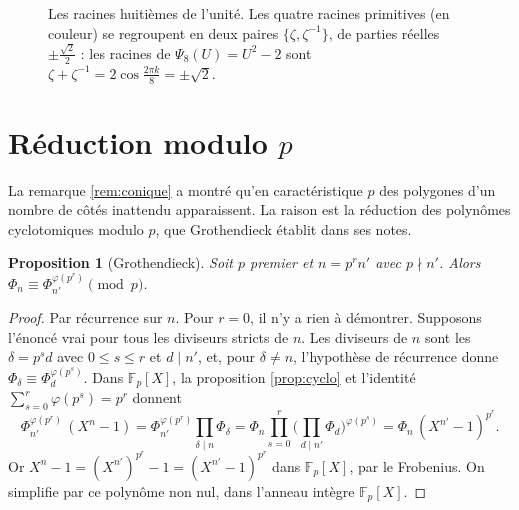 \documentclass[11pt,a4paper]{article}
\theoremstyle{plain}
\newtheorem{proposition}[theoreme]{Proposition}
\theoremstyle{definition}
\theoremstyle{remark}
\newcommand{\F}{\mathbb{F}}
\begin{document}
\begin{figure}[h]
\centering
{}
\caption{Les racines huitièmes de l'unité. Les quatre racines primitives (en couleur) se regroupent en deux paires $\{\zeta,\zeta^{-1}\}$, de parties réelles $\pm\frac{\sqrt2}2$ : les racines de $\Psi_8(U)=U^2-2$ sont $\zeta+\zeta^{-1}=2\cos\frac{2\pi k}8=\pm\sqrt2$.}\label{fig:huit}
\end{figure}

\section{Réduction modulo \texorpdfstring{$p$}{p}}

La remarque \ref{rem:conique} a montré qu'en caractéristique $p$ des polygones d'un nombre de côtés inattendu apparaissent. La raison est la réduction des polynômes cyclotomiques modulo $p$, que Grothendieck établit dans ses notes.

\begin{proposition}[Grothendieck]\label{prop:modp}
Soit $p$ premier et $n=p^rn'$ avec $p\nmid n'$. Alors $\Phi_n\equiv\Phi_{n'}^{\varphi(p^r)}\pmod p$.
\end{proposition}

\begin{proof}
Par récurrence sur $n$. Pour $r=0$, il n'y a rien à démontrer. Supposons l'énoncé vrai pour tous les diviseurs stricts de $n$. Les diviseurs de $n$ sont les $\delta=p^sd$ avec $0\leq s\leq r$ et $d\mid n'$, et, pour $\delta\neq n$, l'hypothèse de récurrence donne $\Phi_\delta\equiv\Phi_d^{\varphi(p^s)}$. Dans $\F_p[X]$, la proposition \ref{prop:cyclo} et l'identité $\sum_{s=0}^r\varphi(p^s)=p^r$ donnent
\[
  \Phi_{n'}^{\varphi(p^r)}\,(X^n-1)=\Phi_{n'}^{\varphi(p^r)}\prod_{\delta\mid n}\Phi_\delta
  =\Phi_n\prod_{s=0}^r\Big(\prod_{d\mid n'}\Phi_d\Big)^{\varphi(p^s)}=\Phi_n\,(X^{n'}-1)^{p^r} .
\]
Or $X^n-1=(X^{n'})^{p^r}-1=(X^{n'}-1)^{p^r}$ dans $\F_p[X]$, par le Frobenius. On simplifie par ce polynôme non nul, dans l'anneau intègre $\F_p[X]$.
\end{proof}
\end{document}
